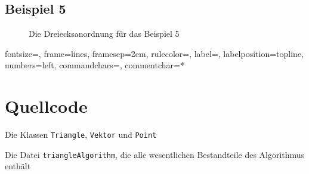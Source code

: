 \documentclass[a4paper, notitlepage, 12pt]{scrartcl}
\newenvironment{longlisting}{\captionsetup{type=listing}}{}
\begin{document}
\subsection{Beispiel 5}
\begin{figure}[H] 
	
	\caption{Die Dreiecksanordnung für das Beispiel 5}
\end{figure}
%
{fontsize=\footnotesize,
	frame=lines,  %
	framesep=2em, %
	rulecolor=\color{Gray},
	label=,
	labelposition=topline,
	numbers=left,
	commandchars=\|\(\), %
	commentchar=*        %
}
 \section{Quellcode}
 \renewcommand{\listingscaption}{Quellcode}
 
 \begin{longlisting}
 	
 	\caption{Die Klassen \texttt{Triangle}, \texttt{Vektor} und \texttt{Point}}
 	
 	\caption{Die Datei \texttt{triangleAlgorithm}, die alle wesentlichen Bestandteile des Algorithmus enthält}
 \end{longlisting}
 
 
\end{document}
